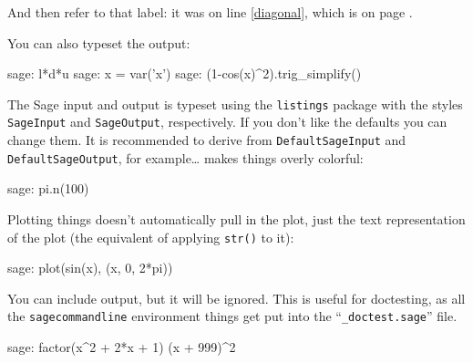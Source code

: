 \documentclass{article}
\begin{document}
And then refer to that label: it was on line \ref{diagonal}, which is on
page \pageref{diagonal}.

You can also typeset the output:

\renewcommand{\sagecommandlinetextoutput}{False}

\begin{sagecommandline}
  sage: l*d*u
  sage: x = var('x')
  sage: (1-cos(x)^2).trig_simplify()
\end{sagecommandline}

\renewcommand{\sagecommandlinetextoutput}{True}

The Sage input and output is typeset using the \texttt{listings} package
with the styles \texttt{SageInput} and \texttt{SageOutput},
respectively. If you don't like the defaults you can change them. It is
recommended to derive from \texttt{DefaultSageInput} and
\texttt{DefaultSageOutput}, for example\ldots
{}
makes things overly colorful:
\begin{sagecommandline}
  sage: pi.n(100)
\end{sagecommandline}

Plotting things doesn't automatically pull in the plot, just the text
representation of the plot (the equivalent of applying \texttt{str()} to
it):

\begin{sagecommandline}
  sage: plot(sin(x), (x, 0, 2*pi))
\end{sagecommandline}

You can include output, but it will be ignored. This is useful for
doctesting, as all the \texttt{sagecommandline} environment things get
put into the ``\texttt{\_doctest.sage}'' file.

\begin{sagecommandline}
  sage: factor(x^2 + 2*x + 1)
  (x + 999)^2
\end{sagecommandline}
\end{document}
